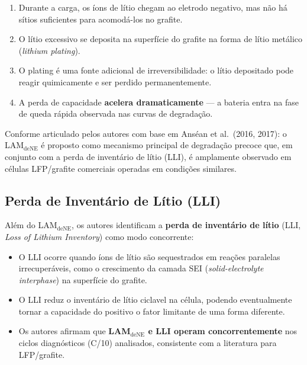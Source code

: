 \documentclass[12pt,a4paper]{article}
\begin{document}
\begin{enumerate}
  \item Durante a carga, os \'{i}ons de l\'{i}tio chegam ao eletrodo negativo,
    mas n\~ao h\'{a} s\'{i}tios suficientes para acomod\'{a}-los no grafite.
  \item O l\'{i}tio excessivo se deposita na superf\'{i}cie do grafite na forma
    de l\'{i}tio met\'{a}lico (\textit{lithium plating}).
  \item O plating \'{e} uma fonte adicional de irreversibilidade: o l\'{i}tio
    depositado pode reagir quimicamente e ser perdido permanentemente.
  \item A perda de capacidade \textbf{acelera dramaticamente} --- a bateria
    entra na fase de queda r\'{a}pida observada nas curvas de degrada\c{c}\~ao.
\end{enumerate}

Conforme articulado pelos autores com base em Ans\'ean et al.\ (2016, 2017):
o LAM$_\text{deNE}$ \'{e} proposto como mecanismo principal de degrada\c{c}\~ao
precoce que, em conjunto com a perda de invent\'{a}rio de l\'{i}tio (LLI),
\'{e} amplamente observado em c\'{e}lulas LFP/grafite comerciais operadas em
condi\c{c}\~oes similares.

\subsection{Perda de Invent\'{a}rio de L\'{i}tio (LLI)}

Al\'{e}m do LAM$_\text{deNE}$, os autores identificam a \textbf{perda de invent\'{a}rio
de l\'{i}tio} (LLI, \textit{Loss of Lithium Inventory}) como modo concorrente:

\begin{itemize}
  \item O LLI ocorre quando \'{i}ons de l\'{i}tio s\~ao sequestrados em rea\c{c}\~oes
    paralelas irrecuper\'{a}veis, como o crescimento da camada SEI
    (\textit{solid-electrolyte interphase}) na superf\'{i}cie do grafite.
  \item O LLI reduz o invent\'{a}rio de l\'{i}tio ciclavel na c\'{e}lula, podendo
    eventualmente tornar a capacidade do positivo o fator limitante de
    uma forma diferente.
  \item Os autores afirmam que \textbf{LAM$_\text{deNE}$ e LLI operam
    concorrentemente} nos ciclos diagn\'{o}sticos (C/10) analisados, consistente
    com a literatura para LFP/grafite.
\end{itemize}
\end{document}
